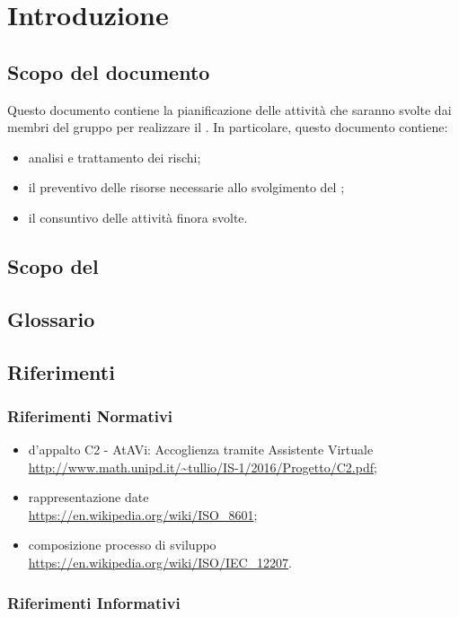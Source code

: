 \section{Introduzione}
	\subsection{Scopo del documento}
	Questo documento contiene la pianificazione delle attività che saranno svolte dai membri del gruppo \GRUPPO per realizzare il  \PROGETTO . In particolare, questo documento contiene:
	\begin{itemize}
		\item analisi e trattamento dei rischi;
		\item il preventivo delle risorse necessarie allo svolgimento del ;
		\item il consuntivo delle attività finora svolte.
	\end{itemize}	
	\subsection{Scopo del }
		\SCOPO
	\subsection{Glossario}
		\GLOSSARIO
	\subsection{Riferimenti}
	\subsubsection{Riferimenti Normativi}
		\begin{itemize}
			\item {} d'appalto C2 - AtAVi: Accoglienza tramite Assistente Virtuale \\
			\url{http://www.math.unipd.it/~tullio/IS-1/2016/Progetto/C2.pdf};
			\item rappresentazione date \\
			\url{https://en.wikipedia.org/wiki/ISO_8601};
			\item composizione processo di sviluppo \\
			\url{https://en.wikipedia.org/wiki/ISO/IEC_12207}.

	\end{itemize}
	    \subsubsection{Riferimenti Informativi}
	    
